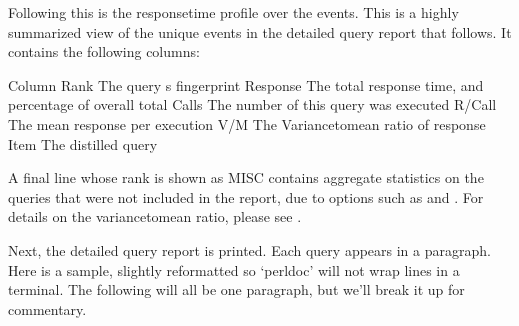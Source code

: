 \documentclass[letterpaper,10pt,english]{sphinxmanual}
\begin{document}
\sphinxAtStartPar
Following this is the response\sphinxhyphen{}time profile over the events.  This is a
highly summarized view of the unique events in the detailed query report
that follows.  It contains the following columns:

\begin{sphinxVerbatim}[commandchars=\\\{\}]
Column        
  
Rank          The query
s fingerprint
Response  The total response time, and percentage of overall total
Calls         The number of  this query was executed
R/Call        The mean response  per execution
V/M           The Variance\PYGZhy{}to\PYGZhy{}mean ratio of response 
Item          The distilled query
\end{sphinxVerbatim}

\sphinxAtStartPar
A final line whose rank is shown as MISC contains aggregate statistics on the
queries that were not included in the report, due to options such as
{\hyperref[\detokenize{mariadb-query-digest:cmdoption-mariadb-query-digest-limit}]{}} and {\hyperref[\detokenize{mariadb-query-digest:cmdoption-mariadb-query-digest-outliers}]{}}.  For details on the variance\sphinxhyphen{}to\sphinxhyphen{}mean ratio,
please see .

\sphinxAtStartPar
Next, the detailed query report is printed.  Each query appears in a paragraph.
Here is a sample, slightly reformatted so ‘perldoc’ will not wrap lines in a
terminal.  The following will all be one paragraph, but we’ll break it up for
commentary.
\end{document}

